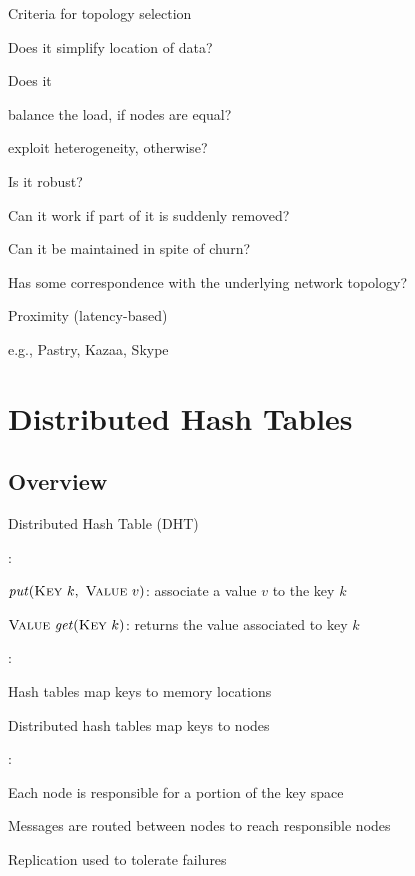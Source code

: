 \begin{frame}{Criteria for topology selection}
	
	
\BIL
\item Does it simplify location of data?
\item Does it
	\BI
	\item balance the load, if nodes are equal?
	\item exploit heterogeneity, otherwise?
	\EI
\item Is it robust?
	\BI
	\item Can it work if part of it is suddenly removed?
	\item Can it be maintained in spite of churn?
	\EI
\item Has some correspondence with the underlying network topology?
\BI
\item Proximity (latency-based)
\item e.g., Pastry, Kazaa, Skype
\EI
\EIL
\end{frame}


\section{Distributed Hash Tables}

\subsection{Overview}

\begin{frame}{Distributed Hash Table (DHT)}

:\\
\BI
\item \alert{$\mathit{put}(\textsc{Key}\ k,\ \textsc{Value}\ v)$}: associate a value $v$ to the key $k$
\item \alert{$\textsc{Value}\ \mathit{get}(\textsc{Key}\ k)$}: returns the value associated to key $k$
\EI

\bigskip
{}:\\
\BI
\item Hash tables map keys to memory locations
\item Distributed hash tables map keys to nodes
\EI

\bigskip
{}:\\
\BI
\item Each node is responsible for a portion of the key space
\item Messages are routed between nodes to reach responsible nodes
\item Replication used to tolerate failures
\EI

\end{frame}

